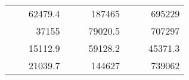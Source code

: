 \begin{table}[H]
\begin{tabular}{|ccrccrccc}
\rowcolor[HTML]{DDFDFF} 
\multicolumn{1}{|c|}{\cellcolor[HTML]{FFFFC7}}                                & \multicolumn{1}{c|}{\cellcolor[HTML]{DDFDFF}}                      & \multicolumn{1}{r|}{\cellcolor[HTML]{DAE8FC}62479.4}   & \multicolumn{1}{c|}{\cellcolor[HTML]{FFFFC7}}                                & \multicolumn{1}{c|}{\cellcolor[HTML]{DDFDFF}}                       & \multicolumn{1}{r|}{\cellcolor[HTML]{DDFDFF}187465}    & \multicolumn{1}{c|}{\cellcolor[HTML]{FFFFC7}}                                & \multicolumn{1}{c|}{\cellcolor[HTML]{DDFDFF}}                      & \multicolumn{1}{r|}{\cellcolor[HTML]{DDFDFF}695229}    \\ \cline{3-3} \cline{6-6} \cline{9-9} 
\multicolumn{1}{|c|}{\cellcolor[HTML]{FFFFC7}}                                & \multicolumn{1}{c|}{\cellcolor[HTML]{DDFDFF}}                      & \multicolumn{1}{r|}{\cellcolor[HTML]{DDFDFF}37155}     & \multicolumn{1}{c|}{\cellcolor[HTML]{FFFFC7}}                                & \multicolumn{1}{c|}{\cellcolor[HTML]{DDFDFF}}                       & \multicolumn{1}{r|}{\cellcolor[HTML]{DAE8FC}79020.5}   & \multicolumn{1}{c|}{\cellcolor[HTML]{FFFFC7}}                                & \multicolumn{1}{c|}{\cellcolor[HTML]{DDFDFF}}                      & \multicolumn{1}{r|}{\cellcolor[HTML]{DAE8FC}707297}    \\ \cline{3-3} \cline{6-6} \cline{9-9} 
\rowcolor[HTML]{DDFDFF} 
\multicolumn{1}{|c|}{\cellcolor[HTML]{FFFFC7}}                                & \multicolumn{1}{c|}{\cellcolor[HTML]{DDFDFF}}                      & \multicolumn{1}{r|}{\cellcolor[HTML]{DAE8FC}15112.9}   & \multicolumn{1}{c|}{\cellcolor[HTML]{FFFFC7}}                                & \multicolumn{1}{c|}{\cellcolor[HTML]{DDFDFF}}                       & \multicolumn{1}{r|}{\cellcolor[HTML]{DDFDFF}59128.2}   & \multicolumn{1}{c|}{\cellcolor[HTML]{FFFFC7}}                                & \multicolumn{1}{c|}{\cellcolor[HTML]{DDFDFF}}                      & \multicolumn{1}{r|}{\cellcolor[HTML]{DDFDFF}45371.3}   \\ \cline{3-3} \cline{6-6} \cline{9-9} 
\multicolumn{1}{|c|}{\cellcolor[HTML]{FFFFC7}}                                & \multicolumn{1}{c|}{\cellcolor[HTML]{DDFDFF}}                      & \multicolumn{1}{r|}{\cellcolor[HTML]{DDFDFF}21039.7}   & \multicolumn{1}{c|}{\cellcolor[HTML]{FFFFC7}}                                & \multicolumn{1}{c|}{\cellcolor[HTML]{DDFDFF}}                       & \multicolumn{1}{r|}{\cellcolor[HTML]{DAE8FC}144627}    & \multicolumn{1}{c|}{\cellcolor[HTML]{FFFFC7}}                                & \multicolumn{1}{c|}{\cellcolor[HTML]{DDFDFF}}                      & \multicolumn{1}{r|}{\cellcolor[HTML]{DAE8FC}739062}    \\ \cline{3-3} \cline{6-6} \cline{9-9} 

\end{tabular}
\end{table}
